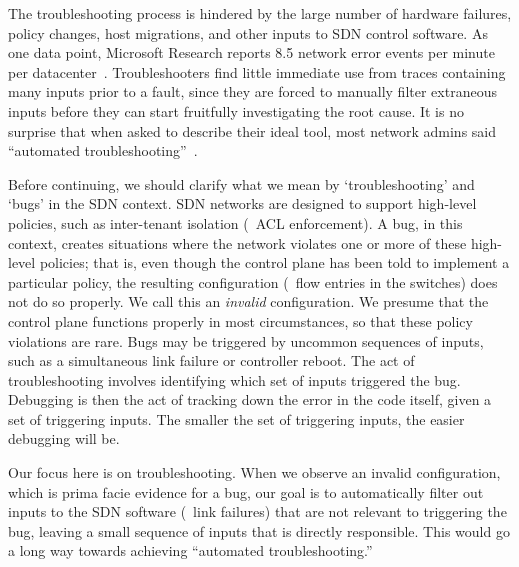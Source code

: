 The troubleshooting process is hindered by the large number of hardware failures,
policy changes, host migrations, and other inputs to SDN control software.
As one data point, Microsoft Research
reports 8.5 network error events per minute per
datacenter~\cite{Greenberg:2009:VSF:1592568.1592576}.
Troubleshooters find little immediate use from traces containing many inputs
prior to a fault,
since they are forced to manually filter extraneous inputs
before they can start fruitfully investigating the root cause.
It is no surprise that when asked to describe their
ideal tool, most network admins said ``automated troubleshooting''~\cite{Zeng:Survey}.


Before continuing, we should clarify what we mean by `troubleshooting' and `bugs' in the SDN context.
SDN networks are designed to support high-level policies, such as inter-tenant
isolation (\ie~ACL enforcement). A bug, in this context, creates situations
where the network violates one or more of these high-level policies; that is, even though the control plane
has been told to implement a particular policy, the resulting configuration (\ie~flow entries in the switches)
does not do so properly. We call this an {\em invalid} configuration.
We presume that the control plane functions properly in most circumstances, so
that these policy violations are rare.
Bugs may be triggered by uncommon sequences of inputs, such as a simultaneous link failure or controller reboot.
The act of troubleshooting involves identifying which set of inputs triggered the bug.
Debugging is then the act of tracking down the error in the code itself, given a
set of triggering inputs.
The smaller the set of triggering inputs, the easier debugging will be.

Our focus here is on troubleshooting. When we observe an invalid
configuration,
which is prima facie evidence for a bug, our goal is
to automatically filter out inputs to the SDN software (\eg~link failures)
that are not relevant to triggering the bug, leaving a small sequence of inputs
that is directly responsible.
This would go a long way towards achieving ``automated troubleshooting.''


